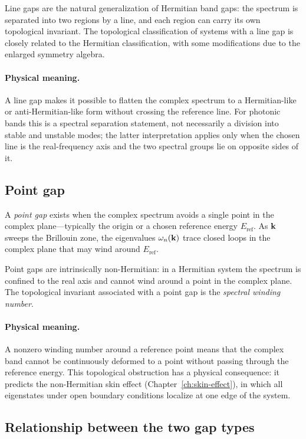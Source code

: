 Line gaps are the natural generalization of Hermitian band gaps: the
spectrum is separated into two regions by a line, and each region can
carry its own topological invariant. The topological classification of
systems with a line gap is closely related to the Hermitian
classification, with some modifications due to the enlarged symmetry
algebra.

\paragraph{Physical meaning.}
A line gap makes it possible to flatten the complex spectrum to a
Hermitian-like or anti-Hermitian-like form without crossing the reference
line. For photonic bands this is a spectral separation statement, not
necessarily a division into stable and unstable modes; the latter
interpretation applies only when the chosen line is the real-frequency
axis and the two spectral groups lie on opposite sides of it.

\subsection{Point gap}
\label{ssec:point-gap}

A \emph{point gap} exists when the complex spectrum avoids a single
point in the complex plane---typically the origin or a chosen reference
energy $E_{\mathrm{ref}}$. As $\mathbf{k}$ sweeps the Brillouin zone, the
eigenvalues $\omega_n(\mathbf{k})$ trace closed loops in the complex plane that
may wind around $E_{\mathrm{ref}}$.

Point gaps are intrinsically non-Hermitian: in a Hermitian system the
spectrum is confined to the real axis and cannot wind around a point in
the complex plane. The topological invariant associated with a point gap
is the \emph{spectral winding number}.

\paragraph{Physical meaning.}
A nonzero winding number around a reference point means that the
complex band cannot be continuously deformed to a point without passing
through the reference energy. This topological obstruction has a
physical consequence: it predicts the non-Hermitian skin
effect (Chapter~\ref{ch:skin-effect}), in which all eigenstates under
open boundary conditions localize at one edge of the system.

\subsection{Relationship between the two gap types}
\label{ssec:gap-relationship}


